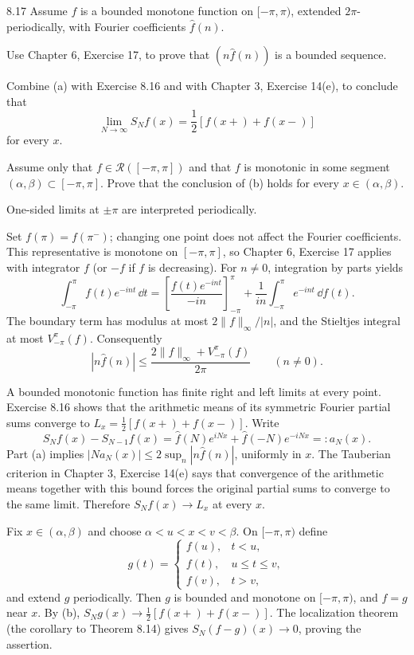 \documentclass[11pt, oneside]{article}
\begin{document}
\begin{exercise}{8.17}
Assume $f$ is a bounded monotone function on $[-\pi, \pi)$, extended $2\pi$-periodically, with Fourier coefficients $\widehat f(n)$.
\begin{exercisesubparts}
\item Use Chapter 6, Exercise 17, to prove that $(n\widehat f(n))$ is a bounded sequence.
\item Combine (a) with Exercise 8.16 and with Chapter 3, Exercise 14(e), to conclude that
\[
 \lim_{N\to\infty}S_Nf(x)=\frac12[f(x+)+f(x-)]
\]
for every $x$.
\item Assume only that $f\in\mathcal{R}([-\pi, \pi])$ and that $f$ is monotonic in some segment $(\alpha, \beta)\subset[-\pi, \pi]$. Prove that the conclusion of (b) holds for every $x\in(\alpha, \beta)$.
\end{exercisesubparts}
\end{exercise}
\begin{solution}
One-sided limits at $\pm\pi$ are interpreted periodically.
\begin{exercisesubparts}
\item Set $f(\pi)=f(\pi^-)$; changing one point does not affect the Fourier coefficients. This representative is monotone on $[-\pi, \pi]$, so Chapter 6, Exercise 17 applies with integrator $f$ (or $-f$ if $f$ is decreasing). For $n\ne0$, integration by parts yields
\[
 \int_{-\pi}^\pi f(t)e^{-int}\,\dd t
 =\left[\frac{f(t)e^{-int}}{-in}\right]_{-\pi}^\pi
 +\frac1{in}\int_{-\pi}^\pi e^{-int}\,\dd f(t).
\]
The boundary term has modulus at most $2\|f\|_\infty/|n|$, and the Stieltjes integral at most $V_{-\pi}^{\pi}(f)$. Consequently
\[
 |n\widehat f(n)|\le\frac{2\|f\|_\infty+V_{-\pi}^{\pi}(f)}{2\pi}
 \qquad(n\ne0).
\]
\item A bounded monotonic function has finite right and left limits at every point. Exercise 8.16 shows that the arithmetic means of its symmetric Fourier partial sums converge to $L_x=\tfrac12[f(x+)+f(x-)]$. Write
\[
 S_Nf(x)-S_{N-1}f(x)=\widehat f(N)e^{iNx}+\widehat f(-N)e^{-iNx}=:a_N(x).
\]
Part (a) implies $|Na_N(x)|\le2\sup_n|n\widehat f(n)|$, uniformly in $x$. The Tauberian criterion in Chapter 3, Exercise 14(e) says that convergence of the arithmetic means together with this bound forces the original partial sums to converge to the same limit. Therefore $S_Nf(x)\to L_x$ at every $x$.
\item Fix $x\in(\alpha, \beta)$ and choose $\alpha<u<x<v<\beta$. On $[-\pi, \pi)$ define
\[
 g(t)=\begin{cases}
 f(u), &t<u, \\
 f(t), &u\le t\le v, \\
 f(v), &t>v,
 \end{cases}
\]
and extend $g$ periodically. Then $g$ is bounded and monotone on $[-\pi, \pi)$, and $f=g$ near $x$. By (b), $S_Ng(x)\to\frac12[f(x+)+f(x-)]$. The localization theorem (the corollary to Theorem 8.14) gives $S_N(f-g)(x)\to0$, proving the assertion.
\end{exercisesubparts}
\end{solution}
\end{document}

